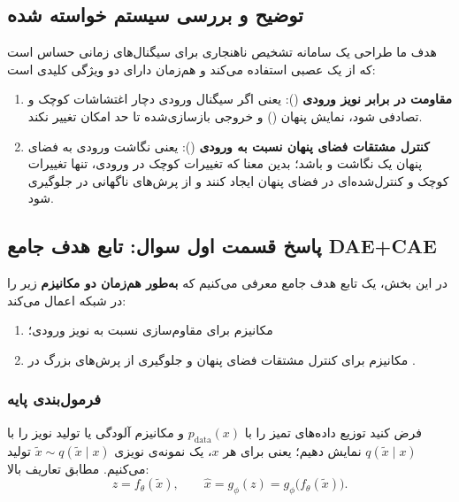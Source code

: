 \documentclass{article}
\begin{document}
\subsection{توضیح و بررسی سیستم خواسته شده}

هدف ما طراحی یک سامانه تشخیص ناهنجاری برای سیگنال‌های زمانی حساس است که از یک  عصبی استفاده می‌کند و هم‌زمان دارای دو ویژگی کلیدی است:
\begin{enumerate}
	\item \textbf{مقاومت در برابر نویز ورودی} (): یعنی اگر سیگنال ورودی دچار اغتشاشات کوچک و تصادفی شود، نمایش پنهان () و خروجی بازسازی‌شده تا حد امکان تغییر نکند.
	\item \textbf{کنترل مشتقات فضای پنهان نسبت به ورودی} (): یعنی نگاشت ورودی به فضای پنهان یک نگاشت  و  باشد؛ بدین معنا که تغییرات کوچک در ورودی، تنها تغییرات کوچک و کنترل‌شده‌ای در فضای پنهان ایجاد کنند و از پرش‌های ناگهانی در  جلوگیری شود.
\end{enumerate}


\subsection{پاسخ قسمت اول سوال: تابع هدف جامع DAE+CAE}

در این بخش، یک تابع هدف جامع معرفی می‌کنیم که \textbf{به‌طور هم‌زمان دو مکانیزم} زیر را در شبکه اعمال می‌کند:
\begin{enumerate}
	\item مکانیزم  برای مقاوم‌سازی نسبت به نویز ورودی؛
	\item مکانیزم  برای کنترل مشتقات فضای پنهان و جلوگیری از پرش‌های بزرگ در .
\end{enumerate}

\subsubsection{فرمول‌بندی پایه}

فرض کنید توزیع داده‌های تمیز را با \(p_{\text{data}}(x)\) و مکانیزم آلودگی یا تولید نویز را با \(q(\tilde{x}\mid x)\) نمایش دهیم؛ یعنی برای هر \(x\)، یک نمونه‌ی نویزی \(\tilde{x} \sim q(\tilde{x}\mid x)\) تولید می‌کنیم. مطابق تعاریف بالا:
\begin{equation}
z = f_\theta(\tilde{x}), \qquad \hat{x} = g_\phi(z) = g_\phi\bigl(f_\theta(\tilde{x})\bigr).
\end{equation}
\end{document}
